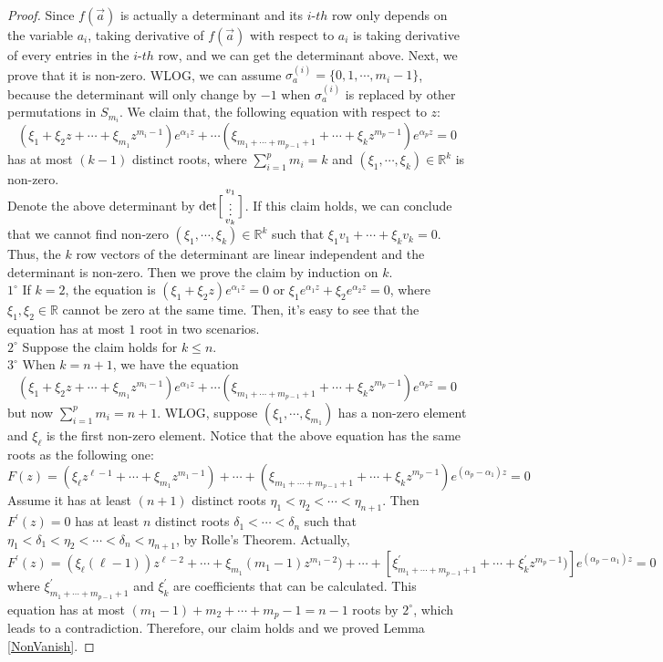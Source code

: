 \begin{proof}Since $f(\vec{a})$ is actually a determinant and its $i$-$th$ row only depends on the variable $a_{i}$, taking derivative of $f(\vec{a})$ with respect to $a_{i}$ is taking derivative of every entries in the $i$-$th$ row, and we can get the determinant above. Next, we prove that it is non-zero. WLOG, we can assume $\sigma_{a}^{(i)}=\{0,1,\cdots,m_{i}-1\}$, because the determinant will only change by $-1$ when $\sigma_{a}^{(i)}$ is replaced by other permutations in $S_{m_i}$. We claim that, the following equation with respect to $z$:
$$(\xi_{1}+\xi_{2}z+\cdots+\xi_{m_1}z^{m_{i}-1})e^{\alpha_{1}z}+\cdots(\xi_{m_{1}+\cdots+m_{p-1}+1}+\cdots+\xi_{k}z^{m_{p}-1})e^{\alpha_{p}z}=0$$ has at most $(k-1)$ distinct roots, where $\sum_{i=1}^{p}m_i=k$ and $(\xi_{1},\cdots,\xi_{k})\in\mathbb{R}^{k}$ is non-zero.\\
Denote the above determinant by $\det\Bigl[\begin{smallmatrix} v_{1}\\\vdots\\ v_{k} \end{smallmatrix}\Bigr]$. If this claim holds, we can conclude that we cannot find non-zero $(\xi_{1},\cdots,\xi_{k})\in\mathbb{R}^{k}$ such that $\xi_{1}v_{1}+\cdots+\xi_{k}v_{k}=0$. Thus, the $k$ row vectors of the determinant are linear independent and the determinant is non-zero. Then we prove the claim by induction on $k$.\\
$1^{\circ}$ If $k=2$, the equation is $(\xi_{1}+\xi_{2}z)e^{\alpha_{1}z}=0$ or $\xi_{1}e^{\alpha_{1}z}+\xi_{2}e^{\alpha_{2}z}=0$, where $\xi_{1},\xi_{2}\in\mathbb{R}$ cannot be zero at the same time. Then, it's easy to see that the equation has at most $1$ root in two scenarios.\\
$2^{\circ}$ Suppose the claim holds for $k\leqslant n$.\\
$3^{\circ}$ When $k=n+1$, we have the equation $$(\xi_{1}+\xi_{2}z+\cdots+\xi_{m_1}z^{m_{i}-1})e^{\alpha_{1}z}+\cdots(\xi_{m_{1}+\cdots+m_{p-1}+1}+\cdots+\xi_{k}z^{m_{p}-1})e^{\alpha_{p}z}=0$$ but now $\sum_{i=1}^{p}m_{i}=n+1$. WLOG, suppose $(\xi_{1},\cdots,\xi_{m_{1}})$ has a non-zero element and $\xi_{\ell}$ is the first non-zero element. Notice that the above equation has the same roots as the following one:
$$F(z)=(\xi_{\ell}z^{\ell-1}+\cdots+\xi_{m_1}z^{m_1-1})+\cdots+(\xi_{m_1+\cdots+m_{p-1}+1}+\cdots+\xi_{k}z^{m_{p}-1})e^{(\alpha_{p}-\alpha_{1})z}=0$$
Assume it has at least $(n+1)$ distinct roots $\eta_{1}<\eta_{2}<\cdots<\eta_{n+1}$. Then $F^{\prime}(z)=0$ has at least $n$ distinct roots $\delta_{1}<\cdots<\delta_{n}$ such that $\eta_{1}<\delta_{1}<\eta_{2}<\cdots<\delta_{n}<\eta_{n+1}$, by Rolle's Theorem. Actually, $F^{\prime}(z)=(\xi_{\ell}(\ell-1))z^{\ell-2}+\cdots+\xi_{m_1}(m_1-1)z^{m_{1}-2})+\cdots+[\xi_{m_1+\cdots+m_{p-1}+1}^{\prime}+\cdots+\xi_{k}^{\prime}z^{m_{p}-1})]e^{(\alpha_{p}-\alpha_{1})z}=0$
where $\xi_{m_1+\cdots+m_{p-1}+1}^{\prime}$ and $\xi_{k}^{\prime}$ are coefficients that can be calculated. This equation has at most $(m_1-1)+m_2+\cdots+m_{p}-1=n-1$ roots by $2^{\circ}$, which leads to a contradiction. Therefore, our claim holds and we proved Lemma \ref{NonVanish}.
\end{proof}
